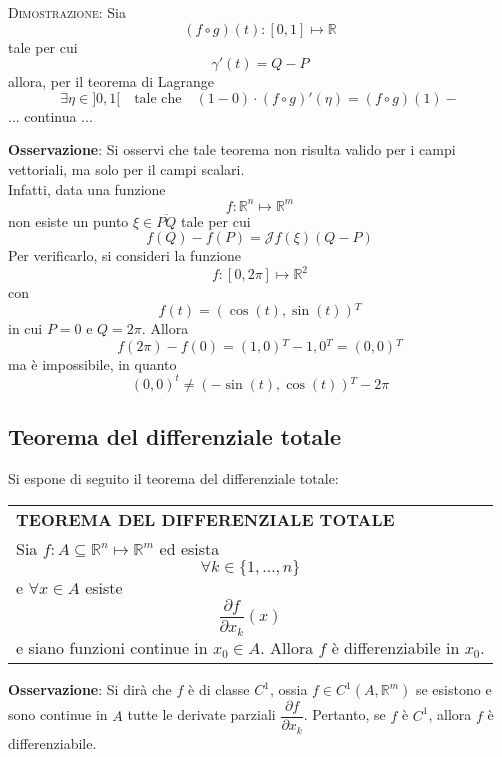 \documentclass[a4paper]{extarticle}
\renewcommand\arraystretch{}
\begin{document}
\vspace{2em}
\noindent
\normalfont \normalsize
\textsc{Dimostrazione}: Sia
\[(f \circ g) (t) : [0,1] \longmapsto \mathbb{R}\]
tale per cui
\[\gamma'(t) = Q-P\]
allora, per il teorema di Lagrange
\[\exists \eta \in ]0,1[ \hspace{1em} \text{tale che} \hspace{1em} (1-0) \cdot (f \circ g)'(\eta) = (f \circ g)(1) - \]
... continua ...


\vspace{1em}
\noindent
\textbf{Osservazione}: Si osservi che tale teorema non risulta valido per i campi vettoriali, ma solo per il campi scalari.\\
Infatti, data una funzione
\[f : \mathbb{R}^n \longmapsto \mathbb{R}^m\]
non esiste un punto $\xi \in \overline{PQ}$ tale per cui
\[f(Q)-f(P)= \mathcal{J} f(\xi) (Q-P)\]
Per verificarlo, si consideri la funzione
\[f : [0,2\pi] \longmapsto \mathbb{R}^2\]
con
\[f(t)=(\cos(t),\sin(t)){^T}\]
in cui $P=0$ e $Q=2\pi$. Allora
\[f(2\pi)-f(0) = (1,0){^T} - {1,0}{^T} = (0,0){^T}\]
ma è impossibile, in quanto
\[(0,0)^{t} \neq (-\sin(t),\cos(t)){^T} - 2\pi\]

\vspace{1em}
\noindent
\subsection{Teorema del differenziale totale}
Si espone di seguito il teorema del differenziale totale:

\vspace{1em}
\setlength{\tabcolsep}{14pt}
\renewcommand{\arraystretch}{2}
\noindent
\begin{tabularx}{\textwidth}{@{}|P|@{}}
    \hline
    {\textbf{TEOREMA DEL DIFFERENZIALE TOTALE}}\\
    \parbox{\linewidth}{Sia $f : A \subseteq \mathbb{R}^n \longmapsto \mathbb{R}^m$ ed esista
    \[\forall k \in \{1,\dots,n\}\]
    e $\forall x \in A$ esiste
    \[\dfrac{\partial f}{\partial x_k}(x)\]
    e siano funzioni continue in $x_0 \in A$. Allora $f$ è differenziabile in $x_0$.
    \vspace{3mm}}\\
    \hline
\end{tabularx}

\vspace{2em}
\noindent
\textbf{Osservazione}: Si dirà che $f$ è di classe $C^1$, ossia $f \in C^1(A,\mathbb{R}^m)$ se esistono e sono continue in $A$ tutte le derivate parziali $\dfrac{\partial f}{\partial x_k}$. Pertanto, se $f$ è $C^1$, allora $f$ è differenziabile.
\end{document}
